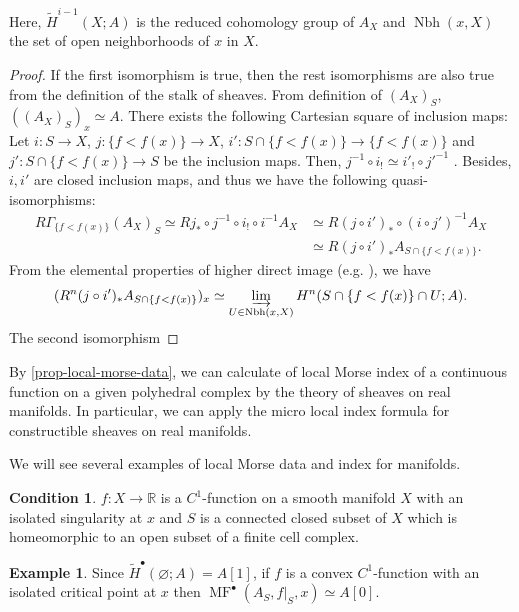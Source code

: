 \documentclass[a4paper,dvipdfmx,reqno,12pt]{amsart}
\theoremstyle{definition}
\newtheorem{example}[theorem]{Example}
\newtheorem{condition}[theorem]{Condition}
\newcommand{\emp}{\varnothing}%
\newcommand{\opn}[1]{\operatorname{#1}}
\numberwithin{equation}{section}
\begin{document}
Here, $\tilde{H}^{i-1}(X;A)$ is the reduced cohomology 
group
of $A_X$ and $\opn{Nbh}(x,X)$ the set of open neighborhoods
of $x$ in $X$. 
\begin{proof}
If the first isomorphism is true, then the rest
isomorphisms are also true from the definition of 
the stalk of sheaves.
From definition of $(A_{X})_S$, 
$((A_{X})_S)_x\simeq A$.
There exists the following Cartesian square of 
inclusion maps:
Let $i\colon S\to X$, 
$j\colon \{f<f(x)\}\to X$, 
$i'\colon S\cap \{f<f(x)\} \to \{f<f(x)\}$ and 
$j'\colon S\cap \{f<f(x)\} \to S$
 be the inclusion maps.
Then, 
$j^{-1}\circ i_!\simeq i'_!\circ j'^{-1}$ 
\cite[Proposition 2.5.11]{MR1299726}.
Besides, $i,i'$ are closed inclusion maps, and thus
we have the following quasi-isomorphisms:
\begin{align}
R\Gamma_{\{f<f(x)\}}(A_{X})_S\simeq 
Rj_*\circ j^{-1} \circ i_! \circ i^{-1}A_X&\simeq 
R (j \circ i')_*\circ (i\circ j')^{-1}A_X \\
&\simeq R (j \circ i')_* A_{S\cap \{f<f(x)\}}.
\end{align}
From the elemental properties of higher direct image
(e.g. \cite[II. Proposition 5.11]{iversenCohomologySheaves1986a}), we have
\begin{align}
  (R^{n} (j \circ i')_* A_{S\cap \{f<f(x)\}})_x\simeq 
\varinjlim_{U\in \opn{Nbh}(x,X)} 
H^{n}(S\cap \{f<f(x)\}\cap U;A).
\end{align}
The second isomorphism 
\end{proof}

By \cref{prop-local-morse-data}, we can calculate
of local Morse index of a continuous function on 
a given polyhedral complex by the theory of sheaves on 
real manifolds. In particular, 
we can apply the micro local index formula 
\cite[Theorem 9.5.6]{MR1299726} for 
constructible sheaves on real manifolds.

We will see several examples of local Morse data 
and index for manifolds.

\begin{condition}
\label{condition-isolated-singularity}
$f\colon X\to \mathbb{R}$ is a $C^{1}$-function on a 
smooth manifold $X$ with an isolated singularity
at $x$ and $S$ is a connected closed subset of $X$ which is homeomorphic to 
an open subset of a finite cell complex. 
\end{condition}

\begin{example}
Since $\tilde{H}^{\bullet}(\emp;A)=A[1]$, 
if $f$ is a convex $C^{1}$-function with an isolated 
critical point at $x$ then
$\opn{MF}^{\bullet}(A_{S},f|_S,x)\simeq A[0]$.
\end{example}
\end{document}
